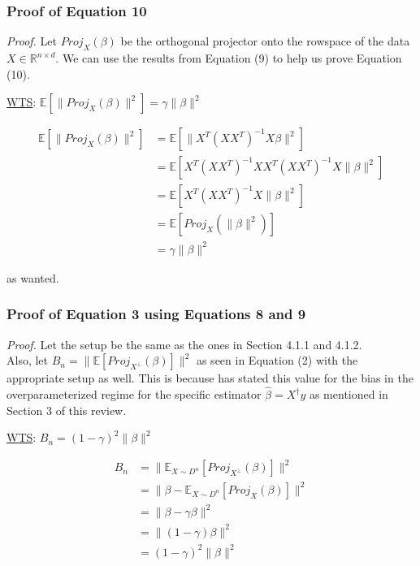 \documentclass{article}
\begin{document}
\newpage

\subsubsection{Proof of Equation 10}

\emph{Proof.}
Let $Proj_X (\beta)$ be the orthogonal projector onto the rowspace of the data $X\in \mathbb{R}^{n \times d}$. We can use the results from Equation (9) to help us prove Equation (10).

\underline{WTS}: $\mathbb{E} [\|Proj_X (\beta)\|^2] = \gamma \|\beta\|^2$ 

\begin{align*}
    \mathbb{E} [\|Proj_X (\beta)\|^2] &= \mathbb{E} [\|X^{T}(XX^{T})^{-1}X\beta\|^2]\\
    &= \mathbb{E} [X^{T}(XX^{T})^{-1}XX^{T}(XX^{T})^{-1}X\|\beta\|^2]\\
    &= \mathbb{E} [X^{T}(XX^{T})^{-1}X\|\beta\|^2]\\
    &= \mathbb{E} [Proj_X (\|\beta\|^2)]\\
    &= \gamma \|\beta\|^2
\end{align*}

as wanted.

\subsubsection{Proof of Equation 3 using Equations 8 and 9}

\emph{Proof.}
Let the setup be the same as the ones in Section 4.1.1 and 4.1.2. \\
Also, let $B_n = \|\mathbb{E} [Proj_{X^\perp} (\beta)]\|^2$ as seen in Equation (2) with the appropriate setup as well. This is because \cite{Nakkiran_2019} has stated this value for the bias in the overparameterized regime for the specific estimator $\hat{\beta} = X^{\dagger}y$ as mentioned in Section 3 of this review.

\underline{WTS}: $B_n = (1-\gamma)^2 \|\beta\|^2$

\begin{align*}
    B_n &= \|\mathbb{E}_{X \sim D^n}[Proj_{X^\perp} (\beta)]\|^2\\
    &= \|\beta - \mathbb{E}_{X \sim D^n} [Proj_X (\beta)]\|^2\\
    &= \|\beta - \gamma \beta\|^2\\
    &= \|(1-\gamma)\beta\|^2\\
    &= (1-\gamma)^2 \|\beta\|^2
\end{align*}
\end{document}
